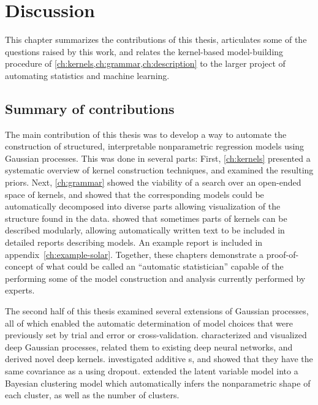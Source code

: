 
\inbpdocument

\chapter{Discussion}
\label{ch:discussion}

This chapter summarizes the contributions of this thesis, articulates some of the questions raised by this work, and relates the kernel-based model-building procedure of \cref{ch:kernels,ch:grammar,ch:description} to the larger project of automating statistics and machine learning.


\section{Summary of contributions}

The main contribution of this thesis was to develop a way to automate the construction of structured, interpretable nonparametric regression models using Gaussian processes.
This was done in several parts:
First, \cref{ch:kernels} presented a systematic overview of kernel construction techniques, and examined the resulting \gp{} priors.
Next, \cref{ch:grammar} showed the viability of a search over an open-ended space of kernels, and showed that the corresponding \gp{} models could be automatically decomposed into diverse parts allowing visualization of the structure found in the data.
 showed that sometimes parts of kernels can be described modularly, allowing automatically written text to be included in detailed reports describing \gp{} models.
An example report is included in appendix~\ref{ch:example-solar}.
Together, these chapters demonstrate a proof-of-concept of what could be called an ``automatic statistician'' capable of the performing some of the model construction and analysis currently performed by experts.

The second half of this thesis examined several extensions of Gaussian processes, all of which enabled the automatic determination of model choices that were previously set by trial and error or cross-validation.
 characterized and visualized deep Gaussian processes, related them to existing deep neural networks, and derived novel deep kernels.
 investigated additive \gp{}s, %
and showed that they have the same covariance as a \gp{} using dropout.
 extended the \gp{} latent variable model into a Bayesian clustering model which automatically infers the nonparametric shape of each cluster, as well as the number of clusters.

